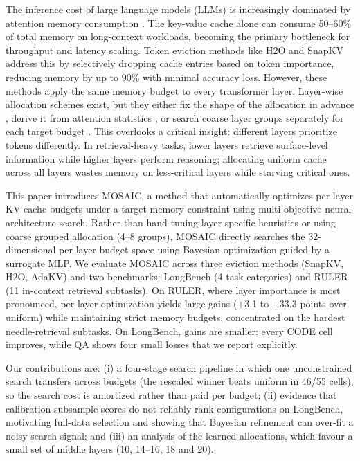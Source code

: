 \documentclass[11pt]{article}
\begin{document}
The inference cost of large language models (LLMs) is increasingly dominated by attention memory consumption \citep{dao2022flashattention}. The key-value cache alone can consume 50–60\% of total memory on long-context workloads, becoming the primary bottleneck for throughput and latency scaling. Token eviction methods like H2O \citep{zhang2023h2o} and SnapKV \citep{li2024snapkv} address this by selectively dropping cache entries based on token importance, reducing memory by up to 90\% with minimal accuracy loss. However, these methods apply the same memory budget to every transformer layer. Layer-wise allocation schemes exist, but they either fix the shape of the allocation in advance \citep{cai2024pyramidkv}, derive it from attention statistics \citep{qin2025cake}, or search coarse layer groups separately for each target budget \citep{yu2025evolkv}. This overlooks a critical insight: different layers prioritize tokens differently. In retrieval-heavy tasks, lower layers retrieve surface-level information while higher layers perform reasoning; allocating uniform cache across all layers wastes memory on less-critical layers while starving critical ones.

This paper introduces MOSAIC, a method that automatically optimizes per-layer KV-cache budgets under a target memory constraint using multi-objective neural architecture search. Rather than hand-tuning layer-specific heuristics or using coarse grouped allocation (4–8 groups), MOSAIC directly searches the 32-dimensional per-layer budget space using Bayesian optimization guided by a surrogate MLP. We evaluate MOSAIC across three eviction methods (SnapKV, H2O, AdaKV) and two benchmarks: LongBench (4 task categories) and RULER (11 in-context retrieval subtasks). On RULER, where layer importance is most pronounced, per-layer optimization yields large gains (+3.1 to +33.3 points over uniform) while maintaining strict memory budgets, concentrated on the hardest needle-retrieval subtasks. On LongBench, gains are smaller: every CODE cell improves, while QA shows four small losses that we report explicitly.

Our contributions are: (i) a four-stage search pipeline in which one unconstrained search transfers across budgets (the rescaled winner beats uniform in 46/55 cells), so the search cost is amortized rather than paid per budget; (ii) evidence that calibration-subsample scores do not reliably rank configurations on LongBench, motivating full-data selection and showing that Bayesian refinement can over-fit a noisy search signal; and (iii) an analysis of the learned allocations, which favour a small set of middle layers (10, 14--16, 18 and 20).
\end{document}
